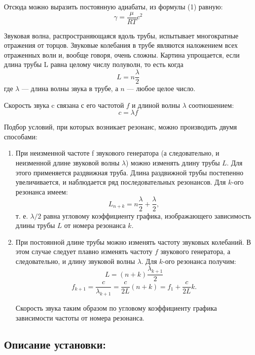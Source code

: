 \documentclass[a4paper,12pt]{article}
\begin{document}
Отсюда можно выразить постоянную адиабаты, из формулы (1) равную:
\begin{equation}
\gamma = \frac{\mu}{RT}c^2
\end{equation}

Звуковая волна, распространяющаяся вдоль трубы, испытывает многократные отражения от торцов. Звуковые колебания в трубе являются наложением всех отраженных волн и, вообще говоря, очень сложны. Картина упрощается, если длина трубы L равна целому числу полуволн, то есть когда
\begin{equation}
L=n\frac{\lambda}{2}
\end{equation}
где $\lambda$ — длина волны звука в трубе, а $n$ — любое целое число.
		
Скорость звука c связана с его частотой $f$ и длиной волны $\lambda$ соотношением:
\begin{equation}
c=\lambda f
\end{equation}
		
Подбор условий, при которых возникает резонанс, можно производить двумя способами:
\begin{enumerate}
\itemsep0em
\item При неизменной частоте f звукового генератора (а следовательно, и неизменной длине звуковой волны $\lambda$) можно изменять длину трубы $L$. Для этого применяется раздвижная труба. Длина раздвижной трубы постепенно увеличивается, и наблюдается ряд последовательных резонансов. Для $k$-ого резонанса имеем:
\begin{equation}
		L_{n+k}=n\frac{\lambda}{2} + \frac{\lambda}{2},	
\end{equation}
т. е. $\lambda/2$ равна угловому коэффициенту графика, изображающего зависимость длины трубы $L$ от номера резонанса $k$.
\item При постоянной длине трубы можно изменять частоту звуковых колебаний. В этом случае следует плавно изменять частоту $f$ звукового генератора, а следовательно, и длину звуковой волны $\lambda$.
Для $k$-ого резонанса получим:
$$L = (n+k)\frac{\lambda_{k+1}}{2}$$
$$f_{k+1} = \frac{c}{\lambda_{k+1}}=\frac{c}{2L}(n+k)=f_1 + \frac{c}{2L}k.$$
		
Скорость звука таким образом по угловому коэффициенту графика зависимости частоты от номера резонанса.

\end{enumerate}
\subsection{Описание установки:}
\end{document}
